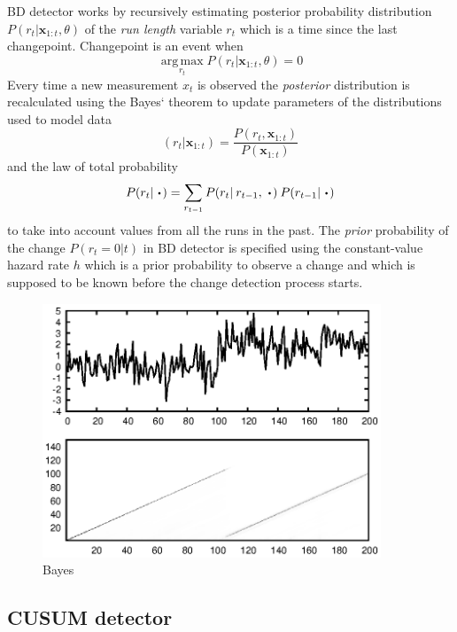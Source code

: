 \documentclass[doctoral,utf8,lot,loar,lof,shortloft,index]{jydiss}
\begin{document}
\cite{adams2007bayesian}
BD detector works by recursively estimating posterior probability distribution $P(r_t | \pmb{x}_{1:t}, \theta)$ of the \textit{run length} variable $r_t$ which is a time since the last changepoint.
Changepoint is an event when
\begin{equation}
	\operatorname*{arg\,max}_{r_t} P(r_t | \pmb{x}_{1:t}, \theta) = 0
\end{equation}
Every time a new measurement $x_t$ is observed the \textit{posterior} distribution is recalculated using the Bayes` theorem to update parameters of the distributions used to model data
\[
(r_t | \pmb{x}_{1:t}) = \frac{P(r_t, \pmb{x}_{1:t})}{P(\pmb{x}_{1:t})}
\]
and the law of total probability
\begin{equation}
	P(r_t|\:\LargeCdot) = \sum_{r_{t-1}} P(r_{t} | \: r_{t-1},\:\LargeCdot) \: P(r_{t-1}|\:\LargeCdot)
\end{equation}
to take into account values from all the runs in the past.
The \textit{prior} probability of the change $P(r_t=0|t)$ in BD detector is specified using the constant-value hazard rate $h$ which is a prior probability to observe a change and which is supposed to be known before the change detection process starts.
\begin{figure}[!htb]
	\centering
	\includegraphics[width=0.9\textwidth]{images/example_output_bayes.eps}
	\caption{Bayes}\label{fig:bayes_output_example}
\end{figure}

\subsection{CUSUM detector}
\end{document}
